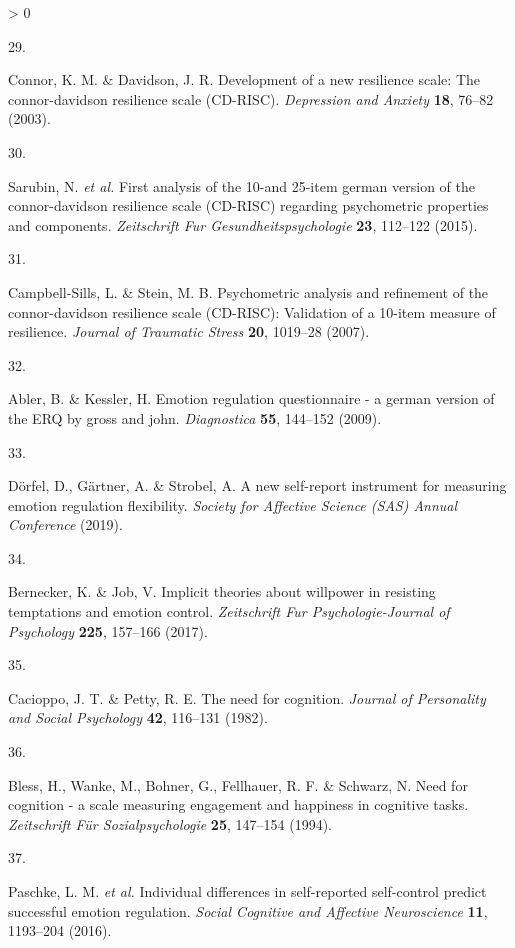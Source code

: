 \documentclass[
  english,
  man,floatsintext]{apa6}
\newlength{\cslhangindent}
\newlength{\csllabelwidth}
\newenvironment{CSLReferences}[2] %
 {%
  \setlength{\parindent}{0pt}
  \ifodd #1 \everypar{\setlength{\hangindent}{\cslhangindent}}\ignorespaces\fi
  \ifnum #2 > 0
  \setlength{\parskip}{#2\baselineskip}
  \fi
 }%
 {}
\newcommand{\CSLLeftMargin}[1]{\parbox[t]{\csllabelwidth}{#1}}
\newcommand{\CSLRightInline}[1]{\parbox[t]{\linewidth - \csllabelwidth}{#1}\break}
\begin{document}
\begin{CSLReferences}{0}{0}
\leavevmode\hypertarget{ref-Connor2003}{}%
\CSLLeftMargin{29. }
\CSLRightInline{Connor, K. M. \& Davidson, J. R. Development of a new resilience scale: The connor-davidson resilience scale (CD-RISC). \emph{Depression and Anxiety} \textbf{18}, 76--82 (2003).}

\leavevmode\hypertarget{ref-Sarubin2015}{}%
\CSLLeftMargin{30. }
\CSLRightInline{Sarubin, N. \emph{et al.} First analysis of the 10-and 25-item german version of the connor-davidson resilience scale (CD-RISC) regarding psychometric properties and components. \emph{Zeitschrift Fur Gesundheitspsychologie} \textbf{23}, 112--122 (2015).}

\leavevmode\hypertarget{ref-Campbell-Sills2007}{}%
\CSLLeftMargin{31. }
\CSLRightInline{Campbell-Sills, L. \& Stein, M. B. Psychometric analysis and refinement of the connor-davidson resilience scale (CD-RISC): Validation of a 10-item measure of resilience. \emph{Journal of Traumatic Stress} \textbf{20}, 1019--28 (2007).}

\leavevmode\hypertarget{ref-Abler2009}{}%
\CSLLeftMargin{32. }
\CSLRightInline{Abler, B. \& Kessler, H. Emotion regulation questionnaire - a german version of the ERQ by gross and john. \emph{Diagnostica} \textbf{55}, 144--152 (2009).}

\leavevmode\hypertarget{ref-Doerfel2019}{}%
\CSLLeftMargin{33. }
\CSLRightInline{Dörfel, D., Gärtner, A. \& Strobel, A. A new self-report instrument for measuring emotion regulation flexibility. \emph{Society for Affective Science (SAS) Annual Conference} (2019).}

\leavevmode\hypertarget{ref-Bernecker2017}{}%
\CSLLeftMargin{34. }
\CSLRightInline{Bernecker, K. \& Job, V. Implicit theories about willpower in resisting temptations and emotion control. \emph{Zeitschrift Fur Psychologie-Journal of Psychology} \textbf{225}, 157--166 (2017).}

\leavevmode\hypertarget{ref-Cacioppo1982}{}%
\CSLLeftMargin{35. }
\CSLRightInline{Cacioppo, J. T. \& Petty, R. E. The need for cognition. \emph{Journal of Personality and Social Psychology} \textbf{42}, 116--131 (1982).}

\leavevmode\hypertarget{ref-Bless1994}{}%
\CSLLeftMargin{36. }
\CSLRightInline{Bless, H., Wanke, M., Bohner, G., Fellhauer, R. F. \& Schwarz, N. Need for cognition - a scale measuring engagement and happiness in cognitive tasks. \emph{Zeitschrift Für Sozialpsychologie} \textbf{25}, 147--154 (1994).}

\leavevmode\hypertarget{ref-Paschke2016}{}%
\CSLLeftMargin{37. }
\CSLRightInline{Paschke, L. M. \emph{et al.} Individual differences in self-reported self-control predict successful emotion regulation. \emph{Social Cognitive and Affective Neuroscience} \textbf{11}, 1193--204 (2016).}


\end{CSLReferences}
\end{document}

